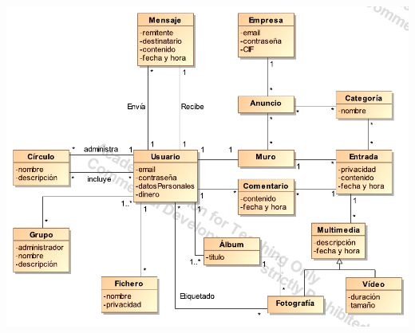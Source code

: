 \documentclass[12pt, a4paper, titlepage]{article}
\begin{document}
\begin{center}
\includegraphics[width=\textwidth]{Imagenes/diagramaModeloDominio}
\end{center}

\end{document}
